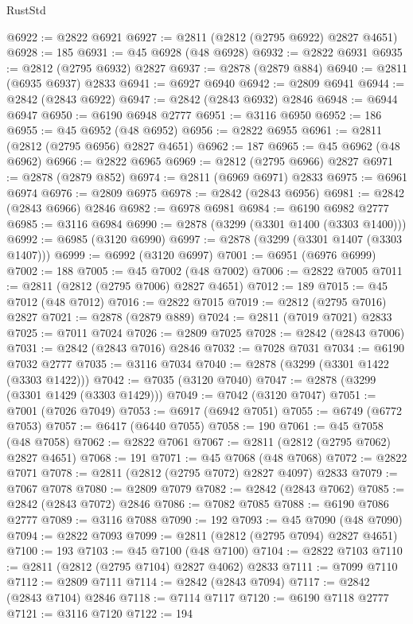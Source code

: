 \begin{lexlean}{RustStd}
\begin{coremodule}
{\begin{coremodule}
{{{{{{{{{{{{{{{{{{{{{{{{{{{{{{{{{@6922 := @2822 @6921
@6927 := @2811 (@2812 (@2795 @6922) @2827 @4651)
@6928 := 185
@6931 := @45 @6928 (@48 @6928)
@6932 := @2822 @6931
@6935 := @2812 (@2795 @6932) @2827
@6937 := @2878 (@2879 @884)
@6940 := @2811 (@6935 @6937) @2833
@6941 := @6927 @6940
@6942 := @2809 @6941
@6944 := @2842 (@2843 @6922)
@6947 := @2842 (@2843 @6932) @2846
@6948 := @6944 @6947
@6950 := @6190 @6948 @2777
@6951 := @3116 @6950
@6952 := 186
@6955 := @45 @6952 (@48 @6952)
@6956 := @2822 @6955
@6961 := @2811 (@2812 (@2795 @6956) @2827 @4651)
@6962 := 187
@6965 := @45 @6962 (@48 @6962)
@6966 := @2822 @6965
@6969 := @2812 (@2795 @6966) @2827
@6971 := @2878 (@2879 @852)
@6974 := @2811 (@6969 @6971) @2833
@6975 := @6961 @6974
@6976 := @2809 @6975
@6978 := @2842 (@2843 @6956)
@6981 := @2842 (@2843 @6966) @2846
@6982 := @6978 @6981
@6984 := @6190 @6982 @2777
@6985 := @3116 @6984
@6990 := @2878 (@3299 (@3301 @1400 (@3303 @1400)))
@6992 := @6985 (@3120 @6990)
@6997 := @2878 (@3299 (@3301 @1407 (@3303 @1407)))
@6999 := @6992 (@3120 @6997)
@7001 := @6951 (@6976 @6999)
@7002 := 188
@7005 := @45 @7002 (@48 @7002)
@7006 := @2822 @7005
@7011 := @2811 (@2812 (@2795 @7006) @2827 @4651)
@7012 := 189
@7015 := @45 @7012 (@48 @7012)
@7016 := @2822 @7015
@7019 := @2812 (@2795 @7016) @2827
@7021 := @2878 (@2879 @889)
@7024 := @2811 (@7019 @7021) @2833
@7025 := @7011 @7024
@7026 := @2809 @7025
@7028 := @2842 (@2843 @7006)
@7031 := @2842 (@2843 @7016) @2846
@7032 := @7028 @7031
@7034 := @6190 @7032 @2777
@7035 := @3116 @7034
@7040 := @2878 (@3299 (@3301 @1422 (@3303 @1422)))
@7042 := @7035 (@3120 @7040)
@7047 := @2878 (@3299 (@3301 @1429 (@3303 @1429)))
@7049 := @7042 (@3120 @7047)
@7051 := @7001 (@7026 @7049)
@7053 := @6917 (@6942 @7051)
@7055 := @6749 (@6772 @7053)
@7057 := @6417 (@6440 @7055)
@7058 := 190
@7061 := @45 @7058 (@48 @7058)
@7062 := @2822 @7061
@7067 := @2811 (@2812 (@2795 @7062) @2827 @4651)
@7068 := 191
@7071 := @45 @7068 (@48 @7068)
@7072 := @2822 @7071
@7078 := @2811 (@2812 (@2795 @7072) @2827 @4097) @2833
@7079 := @7067 @7078
@7080 := @2809 @7079
@7082 := @2842 (@2843 @7062)
@7085 := @2842 (@2843 @7072) @2846
@7086 := @7082 @7085
@7088 := @6190 @7086 @2777
@7089 := @3116 @7088
@7090 := 192
@7093 := @45 @7090 (@48 @7090)
@7094 := @2822 @7093
@7099 := @2811 (@2812 (@2795 @7094) @2827 @4651)
@7100 := 193
@7103 := @45 @7100 (@48 @7100)
@7104 := @2822 @7103
@7110 := @2811 (@2812 (@2795 @7104) @2827 @4062) @2833
@7111 := @7099 @7110
@7112 := @2809 @7111
@7114 := @2842 (@2843 @7094)
@7117 := @2842 (@2843 @7104) @2846
@7118 := @7114 @7117
@7120 := @6190 @7118 @2777
@7121 := @3116 @7120
@7122 := 194
}}}}}}}}}}}}}}}}}}}}}}}}}}}}}}}}}
\end{coremodule}}
\end{coremodule}
\end{lexlean}
